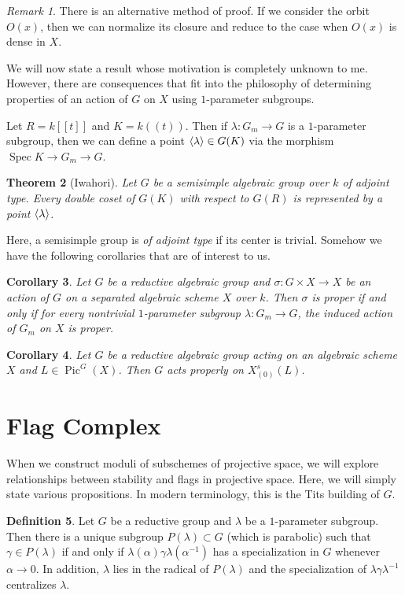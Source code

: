 \documentclass[leqno, openany]{memoir}
\newtheorem{thm}{Theorem}[section]
\newtheorem{cor}[thm]{Corollary}
\theoremstyle{definition}
\newtheorem{defn}[thm]{Definition}
\theoremstyle{remark}
\newtheorem{rmk}[thm]{Remark}
\theoremstyle{plain}
\theoremstyle{definition}
\theoremstyle{remark}
\DeclareMathOperator{\Pic}{Pic}
\DeclareMathOperator{\Spec}{Spec}
\begin{document}
\begin{rmk} There is an alternative method of proof. If we consider the orbit
$O(x)$, then we can normalize its closure and reduce to the case when $O(x)$ is
dense in $X$.  \end{rmk}

We will now state a result whose motivation is completely unknown to me.
However, there are consequences that fit into the philosophy of determining
properties of an action of $G$ on $X$ using $1$-parameter subgroups.

Let $R = k[[t]]$ and $K = k((t))$. Then if $\lambda \colon G_m \to G$ is a
$1$-parameter subgroup, then we can define a point $\ev{\lambda} \in G(K)$ via
the morphism $\Spec K \to G_m \to G$.

\begin{thm}[Iwahori] Let $G$ be a semisimple algebraic group over $k$ of
adjoint type. Every double coset of $G(K)$ with respect to $G(R)$ is
represented by a point $\ev{\lambda}$.  \end{thm}

Here, a semisimple group is \textit{of adjoint type} if its center is trivial.
Somehow we have the following corollaries that are of interest to us.

\begin{cor} Let $G$ be a reductive algebraic group and $\sigma \colon G \times
    X \to X$ be an action of $G$ on a separated algebraic scheme $X$ over $k$.
    Then $\sigma$ is proper if and only if for every nontrivial $1$-parameter
    subgroup $\lambda \colon G_m \to G$, the induced action of $G_m$ on $X$ is
    proper.  \end{cor}

\begin{cor} Let $G$ be a reductive algebraic group acting on an algebraic
scheme $X$ and $L \in \Pic^G(X)$. Then $G$ acts properly on $X^s_{(0)}(L)$.
\end{cor}

\section{Flag Complex}%

When we construct moduli of subschemes of projective space, we will explore
relationships between stability and flags in projective space. Here, we will
simply state various propositions. In modern terminology, this is the Tits
building of $G$.

\begin{defn} Let $G$ be a reductive group and $\lambda$ be a $1$-parameter
    subgroup. Then there is a unique subgroup $P(\lambda) \subset G$ (which is
    parabolic) such that $ \gamma \in P(\lambda)$ if and only if
    $\lambda(\alpha) \gamma \lambda(\alpha^{-1})$ has a specialization in $G$
    whenever $\alpha \to 0$. In addition, $\lambda$ lies in the radical of
    $P(\lambda)$ and the specialization of $\lambda \gamma \lambda^{-1}$
    centralizes $\lambda$.  \end{defn}
\end{document}
